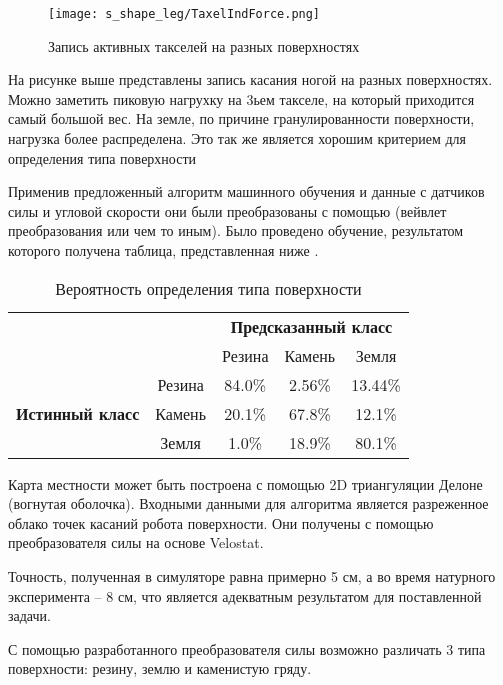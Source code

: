 \begin{figure}[H]
    \centering\texttt{[image: s\_shape\_leg/TaxelIndForce.png]}
    \caption{Запись активных такселей на разных поверхностях}
    \label{fig:s_shape_leg/TaxelIndForce_full.png}
\end{figure}

На рисунке выше  представлены запись касания ногой на разных поверхностях. Можно заметить пиковую нагрухку на 3ьем такселе, на который приходится самый большой вес. На земле, по причине гранулированности поверхности, нагрузка более распределена. Это так же является хорошим критерием для определения типа поверхности

Применив предложенный алгоритм машинного обучения и данные с датчиков силы и угловой скорости они были преобразованы с помощью (вейвлет преобразования или чем то иным). Было проведено обучение, результатом которого получена таблица, представленная ниже .

\begin{table}[H]
    \caption{Вероятность определения типа поверхности}
    \label{tabular:prob_terrain_classification}
    \centering
\begin{tabular}{|c|c|c|c|c|} 
    \cline{3-5}
    \multicolumn{1}{l}{} & \multicolumn{1}{l|}{} & \multicolumn{3}{c|}{\textbf{Предсказанный класс}} \\ 
    \cline{3-5}
    \multicolumn{1}{l}{} &  & Резина & Камень & Земля \\ 
    \hline
    \multirow{3}{*}{{\textbf{Истинный класс}}} & Резина & {\cellcolor[rgb]{0.741,0.843,0.929}}84.0\% & 2.56\% & 13.44\% \\ 
    \hhline{|~----|}
     & Камень & 20.1\% & {\cellcolor[rgb]{0.741,0.843,0.929}}67.8\% & 12.1\% \\ 
    \hhline{|~----|}
     & Земля & 1.0\% & 18.9\% & {\cellcolor[rgb]{0.741,0.843,0.929}}80.1\% \\
    \hline
    \end{tabular}
\end{table}

Карта местности может быть построена с помощью 2D триангуляции Делоне (вогнутая оболочка). Входными данными для алгоритма является разреженное облако точек касаний робота поверхности. Они получены с помощью преобразователя силы на основе Velostat.

Точность, полученная в симуляторе равна примерно 5 см, а во время натурного эксперимента -- 8 см, что является адекватным результатом для поставленной задачи.

С помощью разработанного преобразователя силы возможно различать 3 типа поверхности: резину, землю и каменистую гряду.